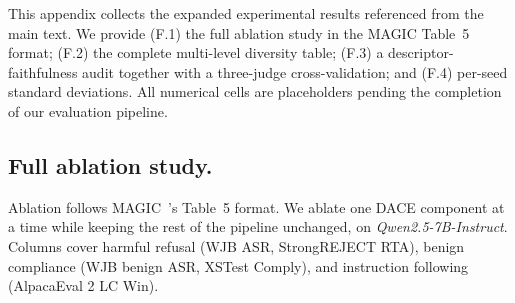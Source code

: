 \documentclass{article}
\newcommand{\method}{\textsc{DACE}\xspace}
\begin{document}
This appendix collects the expanded experimental results referenced from the main text. We provide (F.1) the full ablation study in the MAGIC Table~5 format; (F.2) the complete multi-level diversity table; (F.3) a descriptor-faithfulness audit together with a three-judge cross-validation; and (F.4) per-seed standard deviations. All numerical cells are placeholders pending the completion of our evaluation pipeline.


\subsection{Full ablation study.}
\label{apdx:bench-ablation-full}

Ablation follows MAGIC~\citep{magic2025}'s Table~5 format. We ablate one \method component at a time while keeping the rest of the pipeline unchanged, on \textit{Qwen2.5-7B-Instruct}. Columns cover harmful refusal (WJB ASR, StrongREJECT RTA), benign compliance (WJB benign ASR, XSTest Comply), and instruction following (AlpacaEval 2 LC Win).
\end{document}

